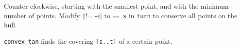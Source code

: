 Counter-clockwise, starting with the smallest point, and with the minimum number of points. Modify \texttt|!= -s| to \texttt{== s} in \texttt{turn} to conserve all points on the hull.

\texttt{convex_tan} finds the covering \texttt{[s..t]} of a certain point. 

\inputminted{cpp}{src/geometry/2d-geometry/convex-hull.cpp.com}
